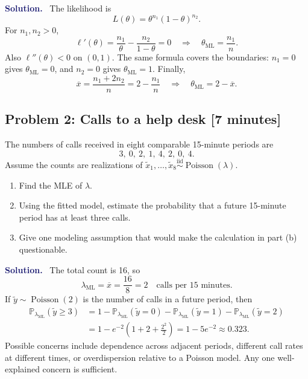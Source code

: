 \documentclass[11pt]{article}
\newcommand{\Pbb}{\mathbb{P}}
\newcommand{\iid}{\mathrel{\overset{\mathrm{iid}}{\sim}}}
\newcommand{\MLE}{\mathrm{ML}}
\newcommand{\rv}[1]{\widetilde{#1}}
\newenvironment{answer}{%
    \par\medskip\noindent\textcolor{MidnightBlue}{\textbf{Solution.}}\ }
    {\par\medskip}
\newcommand{\workingspace}[1]{}
\newcommand{\workingspace}[1]{\vspace{#1}}
\begin{document}
\begin{answer}
The likelihood is
\[
  L(\theta)=\theta^{n_1}(1-\theta)^{n_2}.
\]
For $n_1,n_2>0$,
\[
  \ell'(\theta)=\frac{n_1}{\theta}-\frac{n_2}{1-\theta}=0
  \quad\Longrightarrow\quad
  \theta_{\MLE}=\frac{n_1}{n}.
\]
Also $\ell''(\theta)<0$ on $(0,1)$. The same formula covers the boundaries:
$n_1=0$ gives $\theta_{\MLE}=0$, and $n_2=0$ gives $\theta_{\MLE}=1$.
Finally,
\[
  \overline x=\frac{n_1+2n_2}{n}=2-\frac{n_1}{n}
  \quad\Longrightarrow\quad
  \theta_{\MLE}=2-\overline x.
\]
\end{answer}

\subsection*{Problem 2: Calls to a help desk \hfill [7 minutes]}
The numbers of calls received in eight comparable 15-minute periods are
\[
  3,\ 0,\ 2,\ 1,\ 4,\ 2,\ 0,\ 4.
\]
Assume the counts are realizations of
$\rv{x}_1,\ldots,\rv{x}_8\iid\operatorname{Poisson}(\lambda)$.
\begin{enumerate}[label=(\alph*),itemsep=0.35em]
  \item Find the MLE of $\lambda$.
  \item Using the fitted model, estimate the probability that a future
        15-minute period has at least three calls.
  \item Give one modeling assumption that would make the calculation in
        part (b) questionable.
\end{enumerate}
\workingspace{4.5cm}

\begin{answer}
The total count is 16, so
\[
  \lambda_{\MLE}=\overline x=\frac{16}{8}=2
  \quad\text{calls per 15 minutes}.
\]
If $\rv{y}\sim\operatorname{Poisson}(2)$ is the number of calls in a future
period, then
\[
  \begin{aligned}
  \Pbb_{\lambda_{\MLE}}(\rv{y}\geq3)
  &=1-\Pbb_{\lambda_{\MLE}}(\rv{y}=0)
    -\Pbb_{\lambda_{\MLE}}(\rv{y}=1)
    -\Pbb_{\lambda_{\MLE}}(\rv{y}=2)\\
  &=1-e^{-2}\left(1+2+\frac{2^2}{2}\right)
   =1-5e^{-2}\approx0.323.
  \end{aligned}
\]
Possible concerns include dependence across adjacent periods, different call
rates at different times, or overdispersion relative to a Poisson model. Any
one well-explained concern is sufficient.
\end{answer}

\newpage
\end{document}
